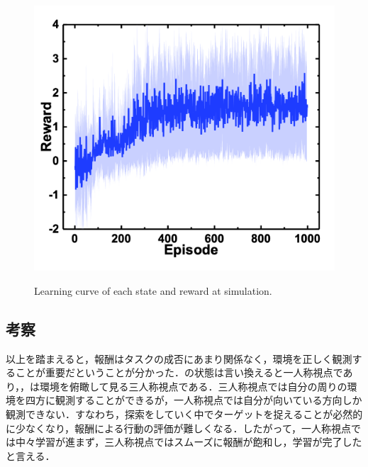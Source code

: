 \begin{figure}[H]
\begin{minipage}{0.4\linewidth}
        \label{fig:報酬距離}
    \end{minipage}
    \begin{minipage}{0.4\linewidth}
        \centering
        \includegraphics[width=0.9\linewidth]{figure/chapter3/QL_rew=redArea_obs=posvec_origin}
        \label{fig:報酬面積}
    \end{minipage}
    \caption{Learning curve of each state and reward at simulation.}
    \label{fig:シミュレーション結果}
\end{figure}
\subsection{考察}


以上を踏まえると，報酬はタスクの成否にあまり関係なく，環境を正しく観測することが重要だということが分かった．の状態は言い換えると一人称視点であり，，は環境を俯瞰して見る三人称視点である．三人称視点では自分の周りの環境を四方に観測することができるが，一人称視点では自分が向いている方向しか観測できない．すなわち，探索をしていく中でターゲットを捉えることが必然的に少なくなり，報酬による行動の評価が難しくなる．したがって，一人称視点では中々学習が進まず，三人称視点ではスムーズに報酬が飽和し，学習が完了したと言える．


